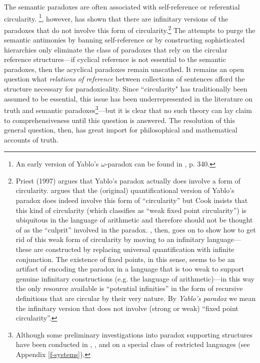 \documentclass[12pt]{kluwer}
\theoremstyle{remark}
\begin{document}




The semantic paradoxes are often associated with self-reference or referential circularity. \cite{yablo93}\footnote{An early version of Yablo's $\omega$-paradox can be found in \cite{yablo85}, p. 340.}, however, has shown that there are infinitary versions of the paradoxes that do not involve this form of circularity.\footnote{Priest (1997) argues that Yablo's paradox actually does involve a form of circularity. \cite{cook2006} argues that the (original) quantificational version of Yablo's paradox does indeed involve this form of ``circularity'' but Cook insists that this kind of circularity (which \cite{cook2006} classifies as ``weak fixed point circularity'') is ubiquitous in the language of arithmetic and therefore should not be thought of as the ``culprit'' involved in the paradox. \cite{cook2006}, then, goes on to show how to get rid of this weak form of circularity by moving to an infinitary language---these are constructed by replacing universal quantification with infinite conjunction. The existence of fixed points, in this sense, seems to be an artifact of encoding the paradox in a language that is too weak to support genuine infinitary constructions (e.g. the language of arithmetic)---in this way the only resource available is ``potential infinities'' in the form of recursive definitions that are circular by their very nature. By \textit{Yablo's paradox} we mean the infinitary version that does not involve (strong or weak) ``fixed point circularity''.}  The attempts to purge the semantic antimonies by banning self-reference or by constructing sophisticated hierarchies only eliminate the class of paradoxes that rely on the circular reference structures---if cyclical reference is not essential to the semantic paradoxes, then the acyclical paradoxes remain unscathed. It remains an open question what \textit{relations of reference} between collections of sentences afford the structure necessary for paradoxicality. Since ``circularity" has traditionally been assumed to be essential, this issue has been underrepresented in the literature on truth and semantic paradoxes\footnote{Although some preliminary investigations into paradox supporting structures have been conducted in \cite{yablo82}, \cite{yablo93}, \cite{yablo06} and \cite{cook} on a special class of restricted languages (see Appendix \ref{f-systems}).}---but it is clear that no such theory can lay claim to comprehensiveness until this question is answered. The resolution of this general question, then, has great import for philosophical and mathematical accounts of truth.
\end{document}
